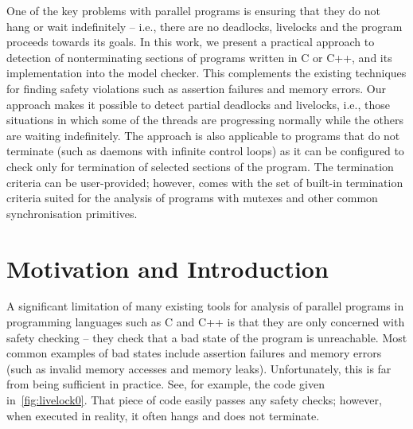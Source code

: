 
\bigskip\noindent
One of the key problems with parallel programs is ensuring that they do not hang or wait indefinitely -- i.e., there are no deadlocks, livelocks and the program proceeds towards its goals.
In this work, we present a practical approach to detection of nonterminating sections of programs written in C or C++, and its implementation into the \divine model checker.
This complements the existing techniques for finding safety violations such as assertion failures and memory errors.
Our approach makes it possible to detect partial deadlocks and livelocks, i.e., those situations in which some of the threads are progressing normally while the others are waiting indefinitely.
The approach is also applicable to programs that do not terminate (such as daemons with infinite control loops) as it can be configured to check only for termination of selected sections of the program.
The termination criteria can be user-provided; however, \divine comes with the set of built-in termination criteria suited for the analysis of programs with mutexes and other common synchronisation primitives.

\section{Motivation and Introduction}

A significant limitation of many existing tools for analysis of parallel
programs in programming languages such as C and C++ is that they are only concerned with safety checking -- they check that a bad state of the program is unreachable.
Most common examples of bad states include assertion failures and memory errors (such as invalid memory accesses and memory leaks).
Unfortunately, this is far from being sufficient in practice.
See, for example, the code given in~\autoref{fig:livelock0}.
That piece of code easily passes any safety checks; however, when executed in reality, it often hangs and does not terminate.

